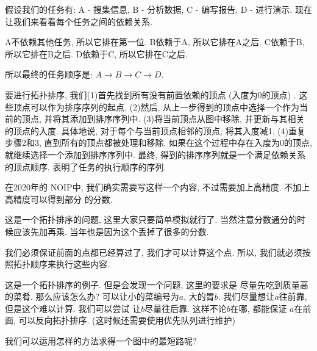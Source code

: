假设我们的任务有: A - 搜集信息, B - 分析数据, C - 编写报告, D - 进行演示. 
现在让我们来看看每个任务之间的依赖关系. 

A不依赖其他任务, 所以它排在第一位. 
B依赖于A, 所以它排在A之后. 
C依赖于B, 所以它排在B之后. 
D依赖于C, 所以它排在C之后. 

所以最终的任务顺序是: $A \rightarrow  B \rightarrow  C \rightarrow  D$. 

要进行拓扑排序, 我们(1)首先找到所有没有前置依赖的顶点 (入度为0的顶点) . 
这些顶点可以作为排序序列的起点. (2)然后, 从上一步得到的顶点中选择一个作为当
前的顶点, 并将其添加到排序序列中. (3)将当前顶点从图中移除, 
并更新与其相关的顶点的入度. 具体地说, 对于每个与当前顶点相邻的顶点, 将其入度减1. 
(4)重复步骤2和3, 直到所有的顶点都被处理和移除. 
如果在这个过程中存在入度为0的顶点, 就继续选择一个添加到排序序列中. 
最终, 得到的排序序列就是一个满足依赖关系的顶点顺序, 表明了任务的执行顺序的序列.

在2020年的
NOIP中, 我们确实需要写这样一个内容, 不过需要加上高精度. 不加上高精度可以得到部分
的分数. 

 这是一个拓扑排序的问题, 这里大家只要简单模拟就行了. 
当然注意分数通分的时候应该先加再乘. 当年也是因为这个丢掉了很多的分数. 

 我们必须保证前面的点都已经算过了, 我们才可以计算这个点. 
所以, 我们就必须按照拓扑顺序来执行这些内容.

 这是一个拓扑排序的例子. 但是会发现一个问题, 这里的要求是
尽量先吃到质量高的菜肴. 那么应该怎么办? 可以让小的菜编号为$a$, 
大的胃$b$. 我们尽量想让$a$往前靠, 但是这个难以计算. 我们可以尝试
让$b$尽量往后靠. 这样不论$b$在哪, 都能保证
$a$在前面, 可以反向拓扑排序. (这时候还需要使用优先队列进行维护) 

 我们可以运用怎样的方法求得一个图中的最短路呢? 

